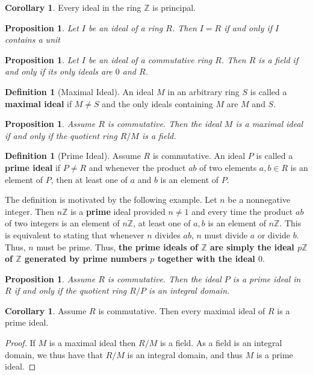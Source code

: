 \documentclass[10pt, oneside, reqno]{amsart}
\theoremstyle{plain}%
\newtheorem{prop}[thm]{Proposition}
\theoremstyle{definition}
\newtheorem{defn}[thm]{Definition}
\newtheorem{cor}[thm]{Corollary}
\theoremstyle{remark}
\newcommand{\Z}{\mathbb{Z}}
\begin{document}
\begin{cor}
    Every ideal in the ring $\Z$ is principal.
\end{cor}

\begin{prop}
    Let $I$ be an ideal of a ring $R$.  Then $I = R$ if and only if $I$ contains a unit
\end{prop}

\begin{prop}
    Let $I$ be an ideal of a commutative ring $R$.  Then $R$ is a field if and only if its only ideals are $0$ and $R$.
\end{prop}

\begin{defn}[Maximal Ideal]
    An ideal $M$ in an arbitrary ring $S$ is called a \textbf{maximal ideal} if $M \neq S$ and the only ideals containing $M$ are $M$ and $S$.
\end{defn}

\begin{prop}
    Assume $R$ is commutative.  Then the ideal $M$ is a maximal ideal if and only if the quotient ring $R/M$ is a field.
\end{prop}


\begin{defn}[Prime Ideal]
    Assume $R$ is commutative.  An ideal $P$ is called a \textbf{prime ideal} if $P \neq R$ and whenever the product $ab$ of two elements $a,b \in R$ is an element of $P$, then at least one of $a$ and $b$ is an element of $P$.  
    
    The definition is motivated by the following example.  Let $n$ be a nonnegative integer.  Then $n\Z$ is a \textbf{prime} ideal provided $n \neq 1$ and every time the product $ab$ of two integers is an element of $n\Z$, at least one of $a,b$ is an element of $n\Z$. This is equivalent to stating that whenever $n$ divides $ab$, $n$ must divide $a$ or divide $b$.  Thus, $n$ must be prime.  Thus, \textbf{the prime ideals of $\Z$ are simply the ideal $p\Z$ of $\Z$ generated by prime numbers $p$ together with the ideal $0$}.
\end{defn}

\begin{prop}
    Assume $R$ is commutative.  Then the ideal $P$ is a prime ideal in $R$ if and only if the quotient ring $R/P$ is an integral domain.
\end{prop}

\begin{cor}
    Assume $R$ is commutative.  Then every maximal ideal of $R$ is a prime ideal.
\end{cor}
\begin{proof}
    If $M$ is a maximal ideal then $R/M$ is a field.  As a field is an integral domain, we thus have that $R/M$ is an integral domain, and thus $M$ is a prime ideal.
\end{proof}
\end{document}
